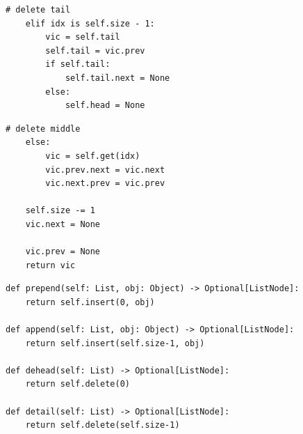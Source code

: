 \documentclass[mathserif, handout]{beamer}
\begin{document}
\begin{frame}[fragile]
	\begin{thmboxside}
		\begin{lstlisting}[style=mypython, firstnumber=last]
    # delete tail
    elif idx is self.size - 1:
        vic = self.tail
        self.tail = vic.prev
        if self.tail:
            self.tail.next = None
        else:
            self.head = None
\end{lstlisting}
	\end{thmboxside}
\end{frame}


\begin{frame}[fragile]
	\begin{thmboxbot}
		\begin{lstlisting}[style=mypython, firstnumber=last]
    # delete middle
    else:
        vic = self.get(idx)
        vic.prev.next = vic.next
        vic.next.prev = vic.prev

    self.size -= 1
    vic.next = None
    
    vic.prev = None
    return vic
\end{lstlisting}
	\end{thmboxbot}
\end{frame}

\begin{frame}[fragile]
	\begin{proofbox}
		\begin{lstlisting}[style=mypython]
def prepend(self: List, obj: Object) -> Optional[ListNode]:
    return self.insert(0, obj)

def append(self: List, obj: Object) -> Optional[ListNode]:
    return self.insert(self.size-1, obj)

def dehead(self: List) -> Optional[ListNode]:
    return self.delete(0)

def detail(self: List) -> Optional[ListNode]:
    return self.delete(self.size-1)
\end{lstlisting}
	\end{proofbox}
\end{frame}
\end{document}
